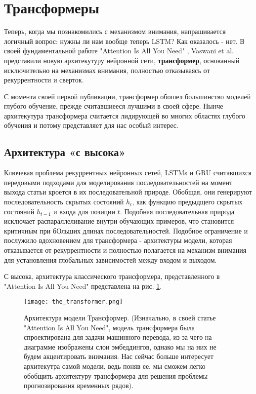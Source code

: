 \section{Трансформеры}

Теперь, когда мы познакомились с механизмом внимания, напрашивается логичный вопрос: 
нужны ли нам вообще теперь LSTM? Как оказалось - нет. В своей фундаментальной работе 
"Attention Is All You Need" \cite{vaswani2017attention}, Vaswani et al. представили 
новую архитекутуру нейронной сети, \textbf{трансформер}, основанный исключительно на 
механизмах внимания, полностью отказываясь от рекуррентности и сверток. 

С момента своей первой публикации, трансформер обошел большинство моделей 
глубого обучение, прежде считавшиееся лучшими в своей сфере. Нынче архитекутура 
трансформера считается лидирующей во многих областях глубого обучения и потому 
представляет для нас особый интерес.


\subsection{Архитектура «с высока»}

Ключевая проблема рекуррентных нейронных сетей, LSTMs и GRU считавшихся передовыми 
подходами для моделирования последовательностей на момент выхода статьи \cite{vaswani2017attention} 
кроется в их последовательной природе. Обобщая, они генерируют последовательность скрытых 
состояний $h_t$, как функцию предыдщего скрытых состояний $h_{t-1}$ и входа для позиции 
$t$. Подобная последовательная природа исключает распараллеливание внутри обучающих 
примеров, что становится критичным при бОльших длинах последовательностей. Подобное 
ограничение и послужило вдохновением для трансформера - архитектуры модели, 
которая отказывается от рекуррентности и полностью полагается на механизм 
внимания для установления глобальных зависимостей между входом и выходом.

С высока, архитектура классического трансформера, представленного в 
"Attention Is All You Need" \cite{vaswani2017attention} представлена 
на рис. \ref{fig:the_transformer}. 

\begin{figure}[h!]
    \centering
    \texttt{[image: the\_transformer.png]}
    \caption{Архитектура модели Трансформер. (Изначально, в своей статье 
    "Attention Is All You Need", модель трансформера была спроектирована для 
    задачи машинного перевода, из-за чего на диаграмме изображены слои эмбеддингов, 
    однако мы на них не будем акцентировать внимания. Нас сейчас больше интересует 
    архитекутра самой модели, ведь поняв ее, мы сможем легко обобщить 
    архитектуру трансформера для решения проблемы прогнозирования временных 
    рядов).}
    \label{fig:the_transformer}
\end{figure}

